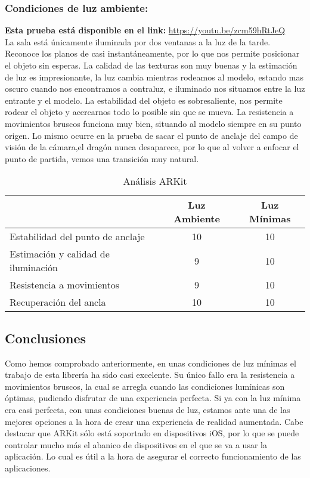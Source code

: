 \subsubsection{Condiciones de luz ambiente:\\}

\textbf{Esta prueba está disponible en el link:} \url{https://youtu.be/zcm59hRtJeQ}\\

La sala está únicamente iluminada por dos ventanas a la luz de la tarde.\\
Reconoce los planos de casi instantáneamente, por lo que nos permite posicionar el objeto sin esperas. La calidad de las texturas son muy buenas y la estimación de luz es impresionante, la luz cambia mientras rodeamos al modelo, estando mas oscuro cuando nos encontramos a contraluz, e iluminado nos situamos entre la luz entrante y el modelo. La estabilidad del objeto es sobresaliente, nos permite rodear el objeto y acercarnos todo lo posible sin que se mueva. La resistencia a movimientos bruscos funciona muy bien, situando al modelo siempre en su punto origen. Lo mismo ocurre en la prueba de sacar el punto de anclaje del campo de visión de la cámara,el dragón nunca desaparece, por lo que al volver a enfocar el punto de partida, vemos una transición muy natural.


\begin{table}[H]
    \centering
     \begin{tabular}{|l|c|c|}
    \hline
          & Luz Ambiente & Luz Mínimas \\
         \hline
        Estabilidad del punto de anclaje   &10 &10\\
        \hline
        Estimación y calidad de iluminación  &9 &10 \\
        \hline
        Resistencia a movimientos  &9 &10 \\
        \hline
        Recuperación del ancla  &10 &10 \\
      \hline
    \end{tabular}
    \caption{Análisis ARKit}
    \label{tab:TARKit}
\end{table}

\subsection{Conclusiones}
Como hemos comprobado anteriormente, en unas condiciones de luz mínimas el trabajo de esta librería ha sido casi excelente. Su único fallo era la resistencia a movimientos bruscos, la cual se arregla cuando las condiciones lumínicas son óptimas, pudiendo disfrutar de una experiencia perfecta. Si ya con la luz mínima era casi perfecta, con unas condiciones buenas de luz, estamos ante una de las mejores opciones a la hora de crear una experiencia de realidad aumentada. Cabe destacar que ARKit sólo está soportado en dispositivos iOS, por lo que se puede controlar mucho más el abanico de dispositivos en el que se va a usar la aplicación. Lo cual es útil a la hora de asegurar el correcto funcionamiento de las aplicaciones.

